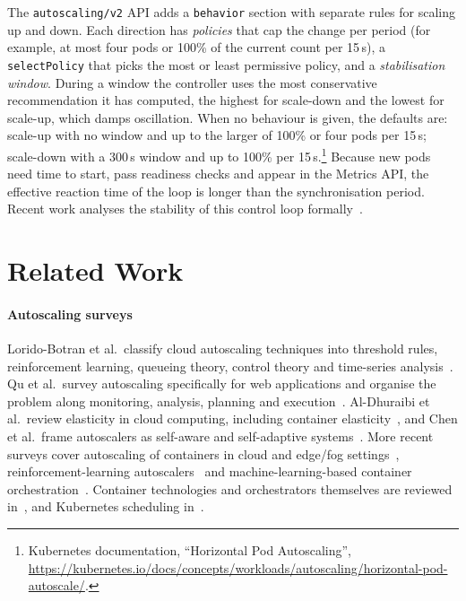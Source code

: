 \documentclass[conference,a4paper]{IEEEtran}
\begin{document}
The \texttt{autoscaling/v2} API adds a \texttt{behavior} section with separate
rules for scaling up and down. Each direction has \emph{policies} that cap the
change per period (for example, at most four pods or 100\% of the current
count per 15\,s), a \texttt{selectPolicy} that picks the most or least
permissive policy, and a \emph{stabilisation window}. During a window the
controller uses the most conservative recommendation it has computed, the
highest for scale-down and the lowest for scale-up, which damps
oscillation. When no behaviour is given, the defaults are: scale-up with no
window and up to the larger of 100\% or four pods per 15\,s; scale-down with a
300\,s window and up to 100\% per 15\,s.\footnote{Kubernetes documentation,
``Horizontal Pod Autoscaling'',
\url{https://kubernetes.io/docs/concepts/workloads/autoscaling/horizontal-pod-autoscale/}.}
Because new pods need time to start, pass readiness checks and appear in the
Metrics API, the effective reaction time of the loop is longer than the
synchronisation period. Recent work analyses the stability of this control
loop formally~\cite{serracanta2025on}.

\section{Related Work}
\label{sec:related}

\paragraph{Autoscaling surveys}
Lorido-Botran et al.\ classify cloud autoscaling techniques into threshold
rules, reinforcement learning, queueing theory, control theory and time-series
analysis~\cite{loridobotran2014a}. Qu et al.\ survey autoscaling specifically
for web applications and organise the problem along monitoring, analysis,
planning and execution~\cite{qu2019autoscaling}. Al-Dhuraibi et al.\ review
elasticity in cloud computing, including container
elasticity~\cite{aldhuraibi2018elasticity}, and Chen et al.\ frame autoscalers
as self-aware and self-adaptive systems~\cite{chen2019a}. More recent surveys
cover autoscaling of containers in cloud and edge/fog
settings~\cite{dogani2023autoscaling}, reinforcement-learning
autoscalers~\cite{gari2021reinforcement} and machine-learning-based container
orchestration~\cite{zhong2022machine}. Container technologies and orchestrators
themselves are reviewed in~\cite{pahl2019cloud,truyen2019a}, and Kubernetes
scheduling in~\cite{carrion2023kubernetes,senjab2023a}.
\end{document}
